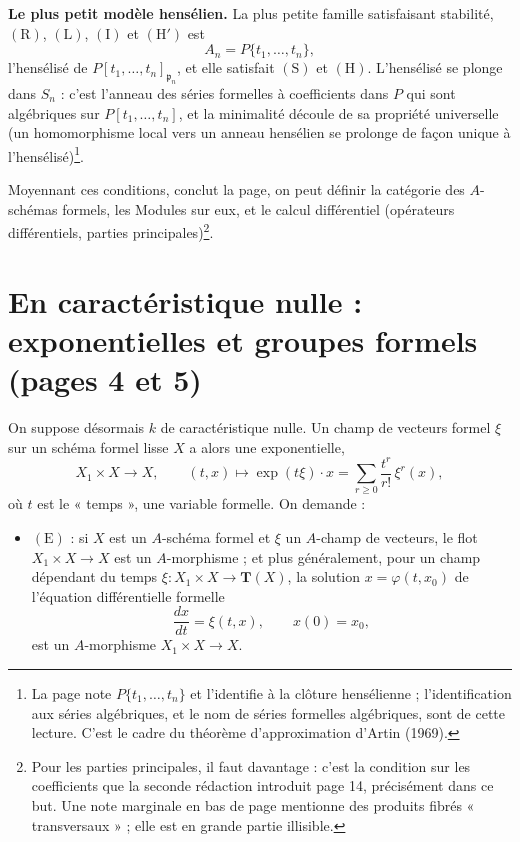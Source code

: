 \documentclass[11pt,a4paper]{article}
\begin{document}
\textbf{Le plus petit modèle hensélien.} La plus petite famille satisfaisant
stabilité, $(\mathrm{R})$, $(\mathrm{L})$, $(\mathrm{I})$ et $(\mathrm{H}')$ est
\[
  A_n = P\{t_1, \ldots, t_n\},
\]
l'hensélisé de $P[t_1, \ldots, t_n]_{\mathfrak{p}_n}$, et elle satisfait
$(\mathrm{S})$ et $(\mathrm{H})$. L'hensélisé se plonge dans $S_n$ : c'est
l'anneau des séries formelles à coefficients dans $P$ qui sont algébriques sur
$P[t_1, \ldots, t_n]$, et la minimalité découle de sa propriété universelle
(un homomorphisme local vers un anneau hensélien se prolonge de façon unique à
l'hensélisé)\footnote{La page note $P\{t_1, \ldots, t_n\}$ et l'identifie à
la clôture hensélienne ; l'identification aux séries algébriques, et le nom de
séries formelles algébriques, sont de cette lecture. C'est le cadre du
théorème d'approximation d'Artin (1969).}.

Moyennant ces conditions, conclut la page, on peut définir la catégorie des
$A$-schémas formels, les Modules sur eux, et le calcul différentiel
(opérateurs différentiels, parties principales)\footnote{Pour les parties
principales, il faut davantage : c'est la condition sur les coefficients que
la seconde rédaction introduit page 14, précisément dans ce but. Une note
marginale en bas de page mentionne des produits fibrés « transversaux » ; elle
est en grande partie illisible.}.

\section*{En caractéristique nulle : exponentielles et groupes formels (pages 4 et 5)}

On suppose désormais $k$ de caractéristique nulle. Un champ de vecteurs formel
$\xi$ sur un schéma formel lisse $X$ a alors une exponentielle,
\[
  X_1 \times X \longrightarrow X, \qquad (t, x) \longmapsto \exp(t\xi) \cdot x
  = \sum_{r \geq 0} \frac{t^r}{r!}\, \xi^r(x),
\]
où $t$ est le « temps », une variable formelle. On demande :

\begin{itemize}
  \item $(\mathrm{E})$ : si $X$ est un $A$-schéma formel et $\xi$ un $A$-champ
    de vecteurs, le flot $X_1 \times X \to X$ est un $A$-morphisme ; et plus
    généralement, pour un champ dépendant du temps
    $\xi : X_1 \times X \to \mathbf{T}(X)$, la solution $x = \varphi(t, x_0)$ de
    l'équation différentielle formelle
    \[
      \frac{dx}{dt} = \xi(t, x), \qquad x(0) = x_0,
    \]
    est un $A$-morphisme $X_1 \times X \to X$.
\end{itemize}
\end{document}
